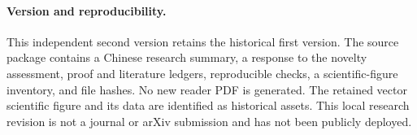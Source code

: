 \paragraph{Version and reproducibility.}
This independent second version retains the historical first version.
The source package contains a Chinese research summary, a response to
the novelty assessment, proof and literature ledgers, reproducible
checks, a scientific-figure inventory, and file hashes. No new reader
PDF is generated. The retained vector scientific figure and its data
are identified as historical assets. This local research revision is
not a journal or arXiv submission and has not been publicly deployed.
